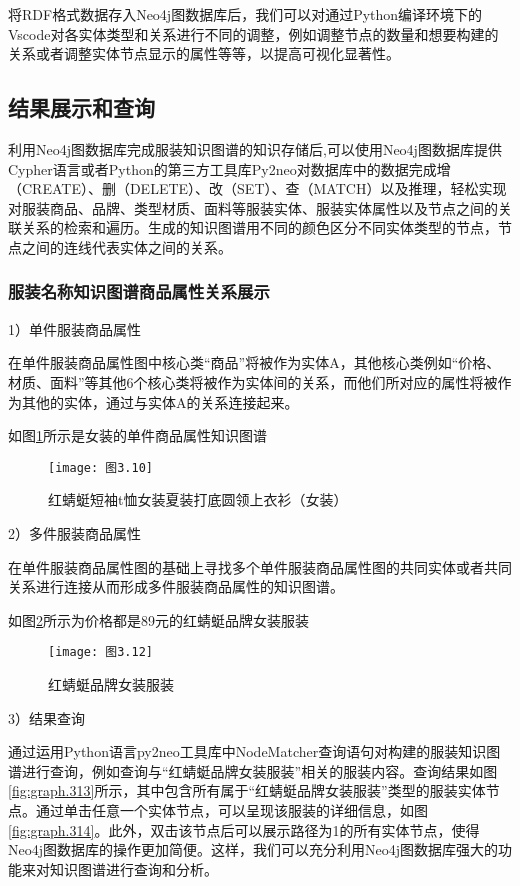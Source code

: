 \documentclass[bachelor_p]{hdu-thesis}
\begin{document}
将RDF格式数据存入Neo4j图数据库后，我们可以对通过Python编译环境下的Vscode对各实体类型和关系进行不同的调整，例如调整节点的数量和想要构建的关系或者调整实体节点显示的属性等等，以提高可视化显著性。
\subsection{结果展示和查询}
利用Neo4j图数据库完成服装知识图谱的知识存储后,可以使用Neo4j图数据库提供Cypher语言或者Python的第三方工具库Py2neo对数据库中的数据完成增（CREATE）、删（DELETE）、改（SET）、查（MATCH）以及推理，轻松实现对服装商品、品牌、类型材质、面料等服装实体、服装实体属性以及节点之间的关联关系的检索和遍历。生成的知识图谱用不同的颜色区分不同实体类型的节点，节点之间的连线代表实体之间的关系。
\subsubsection{服装名称知识图谱商品属性关系展示}

1）单件服装商品属性

在单件服装商品属性图中核心类“商品”将被作为实体A，其他核心类例如“价格、材质、面料”等其他6个核心类将被作为实体间的关系，而他们所对应的属性将被作为其他的实体，通过与实体A的关系连接起来。

如图\ref{fig:graph.310}所示是女装的单件商品属性知识图谱
\begin{figure}[h]
  \centering
  \texttt{[image: 图3.10]}
  \caption{红蜻蜓短袖t恤女装夏装打底圆领上衣衫（女装）}\label{fig:graph.310}
\end{figure}

2）多件服装商品属性

在单件服装商品属性图的基础上寻找多个单件服装商品属性图的共同实体或者共同关系进行连接从而形成多件服装商品属性的知识图谱。

如图\ref{fig:graph.312}所示为价格都是89元的红蜻蜓品牌女装服装
\begin{figure}[h]
  \centering
  \texttt{[image: 图3.12]}
  \caption{红蜻蜓品牌女装服装}\label{fig:graph.312}
\end{figure}

3）结果查询

通过运用Python语言py2neo工具库中NodeMatcher查询语句对构建的服装知识图谱进行查询，例如查询与“红蜻蜓品牌女装服装”相关的服装内容。查询结果如图\ref{fig:graph.313}所示，其中包含所有属于“红蜻蜓品牌女装服装”类型的服装实体节点。通过单击任意一个实体节点，可以呈现该服装的详细信息，如图\ref{fig:graph.314}。此外，双击该节点后可以展示路径为1的所有实体节点，使得Neo4j图数据库的操作更加简便。这样，我们可以充分利用Neo4j图数据库强大的功能来对知识图谱进行查询和分析。
\end{document}
